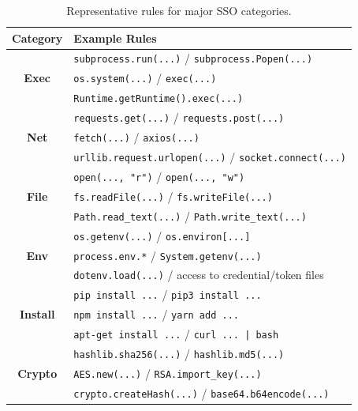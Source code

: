\begin{table}[t]
\centering
\small
\caption{Representative rules for major SSO categories.}
\label{tab:sso-rule-categories}
\begin{tabular}{cl}
\toprule
\textbf{Category} & \textbf{Example Rules} \\
\midrule

\multirow{3}{*}{\textbf{Exec}}
& \texttt{subprocess.run(...)} / \texttt{subprocess.Popen(...)} \\
& \texttt{os.system(...)} / \texttt{exec(...)} \\
& \texttt{Runtime.getRuntime().exec(...)} \\

\hline
\multirow{3}{*}{\textbf{Net}}
& \texttt{requests.get(...)} / \texttt{requests.post(...)} \\
& \texttt{fetch(...)} / \texttt{axios(...)} \\
& \texttt{urllib.request.urlopen(...)} / \texttt{socket.connect(...)} \\

\hline
\multirow{3}{*}{\textbf{File}}
& \texttt{open(..., "r")} / \texttt{open(..., "w")} \\
& \texttt{fs.readFile(...)} / \texttt{fs.writeFile(...)} \\
& \texttt{Path.read\_text(...)} / \texttt{Path.write\_text(...)} \\

\hline
\multirow{3}{*}{\textbf{Env}}
& \texttt{os.getenv(...)} / \texttt{os.environ[...]} \\
& \texttt{process.env.*} / \texttt{System.getenv(...)} \\
& \texttt{dotenv.load(...)} / access to credential/token files \\

\hline
\multirow{3}{*}{\textbf{Install}}
& \texttt{pip install ...} / \texttt{pip3 install ...} \\
& \texttt{npm install ...} / \texttt{yarn add ...} \\
& \texttt{apt-get install ...} / \texttt{curl ... | bash} \\

\hline
\multirow{3}{*}{\textbf{Crypto}}
& \texttt{hashlib.sha256(...)} / \texttt{hashlib.md5(...)} \\
& \texttt{AES.new(...)} / \texttt{RSA.import\_key(...)} \\
& \texttt{crypto.createHash(...)} / \texttt{base64.b64encode(...)} \\

\bottomrule
\end{tabular}
\end{table}


